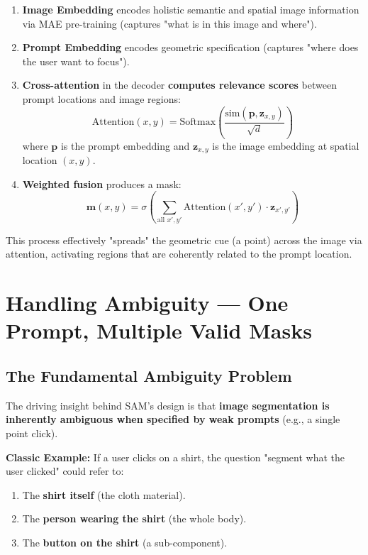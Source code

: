 \begin{enumerate}
    \item \textbf{Image Embedding} encodes holistic semantic and spatial image information via MAE pre-training (captures "what is in this image and where").
    \item \textbf{Prompt Embedding} encodes geometric specification (captures "where does the user want to focus").
    \item \textbf{Cross-attention} in the decoder \textbf{computes relevance scores} between prompt locations and image regions:
       \[ \text{Attention}(x, y) = \text{Softmax}\left(\frac{\text{sim}(\mathbf{p}, \mathbf{z}_{x,y})}{\sqrt{d}}\right) \]
       where $\mathbf{p}$ is the prompt embedding and $\mathbf{z}_{x,y}$ is the image embedding at spatial location $(x, y)$.

    \item \textbf{Weighted fusion} produces a mask:
       \[ \mathbf{m}(x, y) = \sigma\left(\sum_{\text{all } x', y'} \text{Attention}(x', y') \cdot \mathbf{z}_{x',y'}\right) \]
\end{enumerate}

This process effectively "spreads" the geometric cue (a point) across the image via attention, activating regions that are coherently related to the prompt location.

\section{Handling Ambiguity --- One Prompt, Multiple Valid Masks}

\subsection{The Fundamental Ambiguity Problem}

The driving insight behind SAM's design is that \textbf{image segmentation is inherently ambiguous when specified by weak prompts} (e.g., a single point click).

\textbf{Classic Example:} If a user clicks on a shirt, the question "segment what the user clicked" could refer to:
\begin{enumerate}
    \item The \textbf{shirt itself} (the cloth material).
    \item The \textbf{person wearing the shirt} (the whole body).
    \item The \textbf{button on the shirt} (a sub-component).
\end{enumerate}

